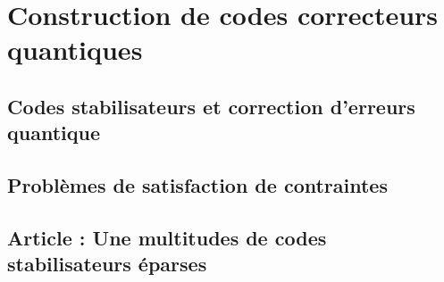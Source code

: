 \begin{comment}
\end{comment}

\chapter{Construction de codes correcteurs quantiques}

\section{Codes stabilisateurs et correction d'erreurs quantique}

\section{Problèmes de satisfaction de contraintes}

\section{Article : Une multitudes de codes stabilisateurs éparses}
